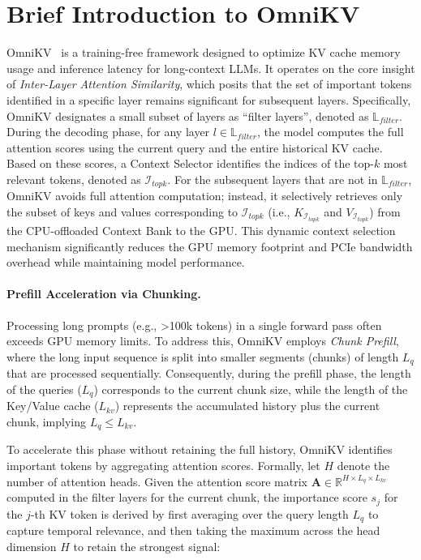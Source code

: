 \section{Brief Introduction to OmniKV}
\label{app:sect:omnikv_method}

OmniKV~\citep{hao2025omnikv} is a training-free framework designed to optimize KV cache memory usage and inference latency for long-context LLMs.
It operates on the core insight of \textit{Inter-Layer Attention Similarity}, which posits that the set of important tokens identified in a specific layer remains significant for subsequent layers.
Specifically, OmniKV designates a small subset of layers as ``filter layers'', denoted as $\mathbb{L}_{filter}$.
During the decoding phase, for any layer $l \in \mathbb{L}_{filter}$, the model computes the full attention scores using the current query and the entire historical KV cache.
Based on these scores, a Context Selector identifies the indices of the top-$k$ most relevant tokens, denoted as $\mathcal{I}_{topk}$.
For the subsequent layers that are not in $\mathbb{L}_{filter}$, OmniKV avoids full attention computation; instead, it selectively retrieves only the subset of keys and values corresponding to $\mathcal{I}_{topk}$ (i.e., $K_{\mathcal{I}_{topk}}$ and $V_{\mathcal{I}_{topk}}$) from the CPU-offloaded Context Bank to the GPU.
This dynamic context selection mechanism significantly reduces the GPU memory footprint and PCIe bandwidth overhead while maintaining model performance.

\paragraph{Prefill Acceleration via Chunking.}
Processing long prompts (e.g., >100k tokens) in a single forward pass often exceeds GPU memory limits.
To address this, OmniKV employs \textit{Chunk Prefill}, where the long input sequence is split into smaller segments (chunks) of length $L_q$ that are processed sequentially.
Consequently, during the prefill phase, the length of the queries ($L_q$) corresponds to the current chunk size, while the length of the Key/Value cache ($L_{kv}$) represents the accumulated history plus the current chunk, implying $L_q \le L_{kv}$.

To accelerate this phase without retaining the full history, OmniKV identifies important tokens by aggregating attention scores.
Formally, let $H$ denote the number of attention heads.
Given the attention score matrix $\mathbf{A} \in \mathbb{R}^{H \times L_q \times L_{kv}}$ computed in the filter layers for the current chunk, the importance score $s_{j}$ for the $j$-th KV token is derived by first averaging over the query length $L_q$ to capture temporal relevance, and then taking the maximum across the head dimension $H$ to retain the strongest signal:


